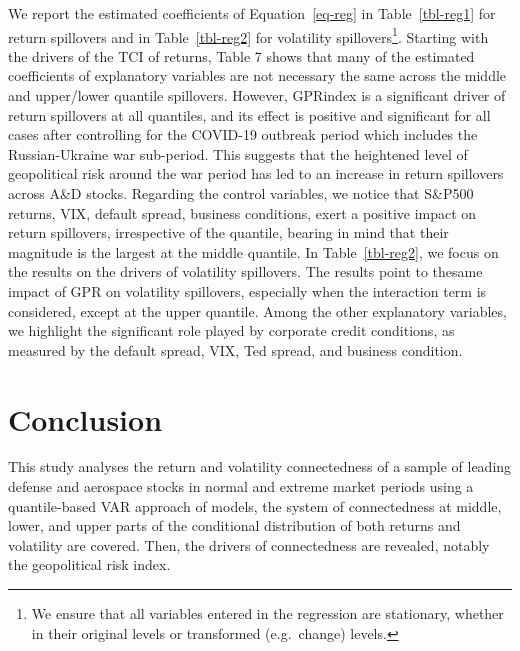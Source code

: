 \documentclass[
  letterpaper,
  DIV=11,
  numbers=noendperiod]{scrartcl}
\begin{document}
We report the estimated coefficients of Equation~\ref{eq-reg} in
Table~\ref{tbl-reg1} for return spillovers and in Table~\ref{tbl-reg2}
for volatility spillovers\footnote{We ensure that all variables entered
  in the regression are stationary, whether in their original levels or
  transformed (e.g.~change) levels.}. Starting with the drivers of the
TCI of returns, Table 7 shows that many of the estimated coefficients of
explanatory variables are not necessary the same across the middle and
upper/lower quantile spillovers. However, GPRindex is a significant
driver of return spillovers at all quantiles, and its effect is positive
and significant for all cases after controlling for the COVID-19
outbreak period which includes the Russian-Ukraine war sub-period. This
suggests that the heightened level of geopolitical risk around the war
period has led to an increase in return spillovers across A\&D stocks.
Regarding the control variables, we notice that S\&P500 returns, VIX,
default spread, business conditions, exert a positive impact on return
spillovers, irrespective of the quantile, bearing in mind that their
magnitude is the largest at the middle quantile. In
Table~\ref{tbl-reg2}, we focus on the results on the drivers of
volatility spillovers. The results point to thesame impact of GPR on
volatility spillovers, especially when the interaction term is
considered, except at the upper quantile. Among the other explanatory
variables, we highlight the significant role played by corporate credit
conditions, as measured by the default spread, VIX, Ted spread, and
business condition.

\hypertarget{conclusion}{%
\section{Conclusion}\label{conclusion}}

This study analyses the return and volatility connectedness of a sample
of leading defense and aerospace stocks in normal and extreme market
periods using a quantile-based VAR approach of models, the system of
connectedness at middle, lower, and upper parts of the conditional
distribution of both returns and volatility are covered. Then, the
drivers of connectedness are revealed, notably the geopolitical risk
index.
\end{document}

